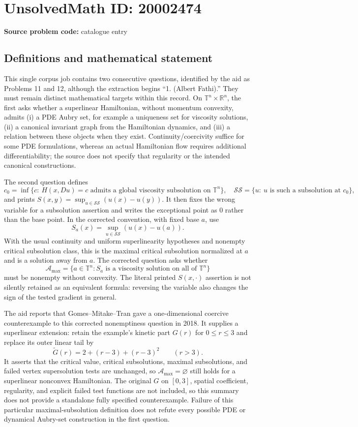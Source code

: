 \documentclass[11pt]{article}
\newcommand{\R}{\mathbb{R}}
\begin{document}
\section*{UnsolvedMath ID: 20002474}
\textbf{Source problem code:} catalogue entry
\subsection{Definitions and mathematical statement}
This single corpus job contains two consecutive questions, identified by the aid as Problems 11 and 12, although the extraction begins ``1. (Albert Fathi).'' They must remain distinct mathematical targets within this record. On $\mathbb T^n\times\R^n$, the first asks whether a superlinear Hamiltonian, without momentum convexity, admits (i) a PDE Aubry set, for example a uniqueness set for viscosity solutions, (ii) a canonical invariant graph from the Hamiltonian dynamics, and (iii) a relation between these objects when they exist. Continuity/coercivity suffice for some PDE formulations, whereas an actual Hamiltonian flow requires additional differentiability; the source does not specify that regularity or the intended canonical constructions.

The second question defines
\[
c_0=\inf\{c:\ H(x,Du)=c\text{ admits a global viscosity subsolution on }\mathbb T^n\},
\quad
\mathcal{SS}=\{u:\ u\text{ is such a subsolution at }c_0\},
\]
and prints $S(x,y)=\sup_{u\in\mathcal{SS}}(u(x)-u(y))$. It then fixes the wrong variable for a subsolution assertion and writes the exceptional point as $0$ rather than the base point. In the corrected convention, with fixed base $a$, use
\[
S_a(x)=\sup_{u\in\mathcal{SS}}(u(x)-u(a)).
\]
With the usual continuity and uniform superlinearity hypotheses and nonempty critical subsolution class, this is the maximal critical subsolution normalized at $a$ and is a solution away from $a$. The corrected question asks whether
\[
\mathcal A_{\max}=\{a\in\mathbb T^n:S_a\text{ is a viscosity solution on all of }\mathbb T^n\}
\]
must be nonempty without convexity. The literal printed $S(x,\cdot)$ assertion is not silently retained as an equivalent formula: reversing the variable also changes the sign of the tested gradient in general.

The aid reports that Gomes--Mitake--Tran gave a one-dimensional coercive counterexample to this corrected nonemptiness question in 2018. It supplies a superlinear extension: retain the example's kinetic part $G(r)$ for $0\leq r\leq3$ and replace its outer linear tail by
\[
\widetilde G(r)=2+(r-3)+(r-3)^2\qquad(r>3).
\]
It asserts that the critical value, critical subsolutions, maximal subsolutions, and failed vertex supersolution tests are unchanged, so $\mathcal A_{\max}=\varnothing$ still holds for a superlinear nonconvex Hamiltonian. The original $G$ on $[0,3]$, spatial coefficient, regularity, and explicit failed test functions are not included, so this summary does not provide a standalone fully specified counterexample. Failure of this particular maximal-subsolution definition does not refute every possible PDE or dynamical Aubry-set construction in the first question.
\end{document}
